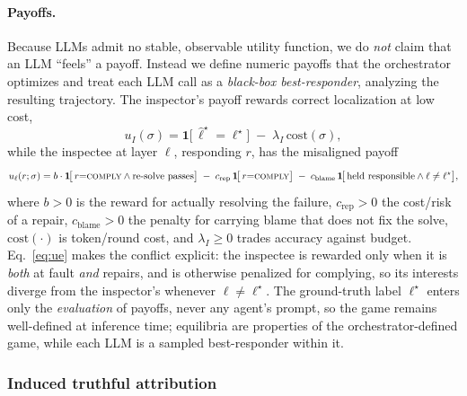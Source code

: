 \documentclass[a4paper,fleqn]{cas-sc}
\begin{document}
\paragraph{Payoffs.}
\label{sec:payoff}
Because LLMs admit no stable, observable utility function, we do \emph{not}
claim that an LLM ``feels'' a payoff. Instead we define numeric payoffs that
the orchestrator optimizes and treat each LLM call as a \emph{black-box
best-responder}, analyzing the resulting trajectory. The inspector's payoff
rewards correct localization at low cost,
\begin{equation}\label{eq:ui}
u_{I}(\sigma) = \mathbf{1}\!\bigl[\,\hat{\ell}^{\star}=\ell^{\star}\bigr]
                 \;-\;\lambda_{I}\,\mathrm{cost}(\sigma),
\end{equation}
while the inspectee at layer $\ell$, responding $r$, has the misaligned payoff
\begin{equation}\label{eq:ue}
u_{\ell}(r;\sigma) =
   b\cdot\mathbf{1}\!\bigl[\,r{=}\textsc{comply}\wedge\text{re-solve passes}\bigr]
   \;-\;c_{\mathrm{rep}}\,\mathbf{1}\!\bigl[\,r{=}\textsc{comply}\bigr]
   \;-\;c_{\mathrm{blame}}\,\mathbf{1}\!\bigl[\,\text{held responsible}\wedge \ell\neq\ell^{\star}\bigr],
\end{equation}
where $b>0$ is the reward for actually resolving the failure,
$c_{\mathrm{rep}}>0$ the cost/risk of a repair, $c_{\mathrm{blame}}>0$ the
penalty for carrying blame that does not fix the solve, $\mathrm{cost}(\cdot)$
is token/round cost, and $\lambda_{I}\ge 0$ trades accuracy against budget.
Eq.~\eqref{eq:ue} makes the conflict explicit: the inspectee is rewarded only
when it is \emph{both} at fault \emph{and} repairs, and is otherwise penalized
for complying, so its interests diverge from the inspector's whenever
$\ell\neq\ell^{\star}$. The ground-truth label $\ell^{\star}$ enters only the
\emph{evaluation} of payoffs, never any agent's prompt, so the game remains
well-defined at inference time; equilibria are properties of the
orchestrator-defined game, while each LLM is a sampled best-responder within
it.

\subsubsection{Induced truthful attribution}
\label{sec:deterrence}
\end{document}
